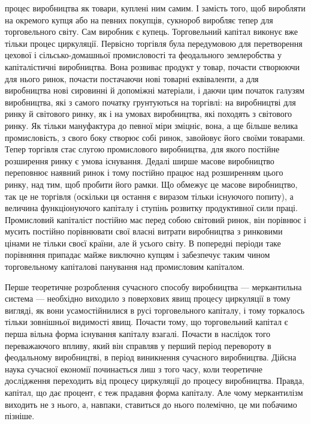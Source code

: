 \parcont{}  %
процес виробництва як товари, куплені ним самим. І замість
того, щоб виробляти на окремого купця або на певних покупців,
сукнороб виробляє тепер для торговельного світу. Сам виробник
є купець. Торговельний капітал виконує вже тільки
процес циркуляції. Первісно торгівля була передумовою для
перетворення цехової і сільсько-домашньої промисловості та феодального
землеробства у капіталістичні виробництва. Вона розвиває
продукт у товар, почасти створюючи для нього ринок,
почасти постачаючи нові товарні еквіваленти, а для виробництва
нові сировинні й допоміжні матеріали, і даючи цим початок
галузям виробництва, які з самого початку грунтуються
на торгівлі: на виробництві для ринку й світового ринку, як і на
умовах виробництва, які походять з світового ринку. Як тільки
мануфактура до певної міри зміцніє, вона, а ще більше велика
промисловість, з свого боку створює собі ринок, завойовує його
своїми товарами. Тепер торгівля стає слугою промислового
виробництва, для якого постійне розширення ринку є умова
існування. Дедалі ширше масове виробництво переповнює наявний
ринок і тому постійно працює над розширенням цього
ринку, над тим, щоб пробити його рамки. Що обмежує це
масове виробництво, так це не торгівля (оскільки ця остання є
виразом тільки існуючого попиту), а величина функціонуючого
капіталу і ступінь розвитку продуктивної сили праці. Промисловий
капіталіст постійно має перед собою світовий ринок, він
порівнює і мусить постійно порівнювати свої власні витрати виробництва
з ринковими цінами не тільки своєї країни, але й усього
світу. В попередні періоди таке порівняння припадає майже виключно
купцям і забезпечує таким чином торговельному капіталові
панування над промисловим капіталом.

Перше теоретичне розроблення сучасного способу виробництва
— меркантильна система — необхідно виходило з поверхових
явищ процесу циркуляції в тому вигляді, як вони усамостійнилися
в русі торговельного капіталу, і тому торкалось
тільки зовнішньої видимості явищ. Почасти тому, що торговельний
капітал є перша вільна форма існування капіталу взагалі.
Почасти в наслідок того переважаючого впливу, який він справляв
у перший період перевороту в феодальному виробництві,
в період виникнення сучасного виробництва. Дійсна наука сучасної
економії починається лиш з того часу, коли теоретичне дослідження
переходить від процесу циркуляції до процесу виробництва.
Правда, капітал, що дає процент, є теж прадавня форма
капіталу. Але чому меркантилізм виходить не з нього, а, навпаки,
ставиться до нього полемічно, це ми побачимо пізніше.
